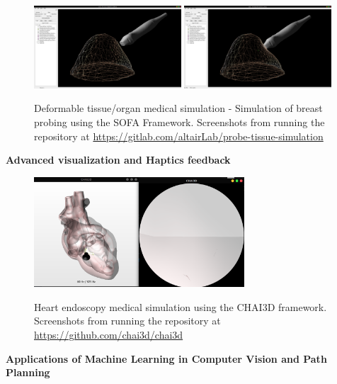 \begin{center}
\begin{figure}[!htb]
\centering
\includegraphics[width=0.49\textwidth]{images/future-work-sofa1.png}
\includegraphics[width=0.49\textwidth]{images/future-work-sofa2.png}\\
\caption{Deformable tissue/organ medical simulation - Simulation of breast probing using the SOFA Framework. Screenshots from running the repository at
\url{https://gitlab.com/altairLab/probe-tissue-simulation}}
\end{figure}
\end{center}

\textbf{Advanced visualization and Haptics feedback} \\

\begin{center}
\begin{figure}[!htb]
\centering
\includegraphics[width=0.7\textwidth]{images/future-work-chai3d.png}\\
\caption{Heart endoscopy medical simulation using the CHAI3D framework. Screenshots from running the repository at
\url{https://github.com/chai3d/chai3d}}
\end{figure}
\end{center}

\textbf{Applications of Machine Learning in Computer Vision and Path Planning} \\